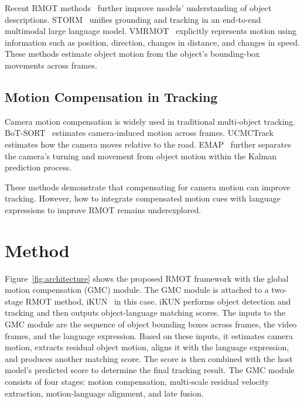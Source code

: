 \documentclass{article}
\begin{document}
Recent RMOT methods~\cite{deeprmot} further improve models' understanding of object descriptions. STORM~\cite{storm} unifies grounding and tracking in an end-to-end multimodal large language model. VMRMOT~\cite{vmrmot} explicitly represents motion using information such as position, direction, changes in distance, and changes in speed. These methods estimate object motion from the object's bounding-box movements across frames.

\subsection{Motion Compensation in Tracking}
Camera motion compensation is widely used in traditional multi-object tracking. BoT-SORT~\cite{botsort} estimates camera-induced motion across frames. UCMCTrack~\cite{ucmctrack} estimates how the camera moves relative to the road. EMAP~\cite{emap} further separates the camera's turning and movement from object motion within the Kalman prediction process.

These methods demonstrate that compensating for camera motion can improve tracking. However, how to integrate compensated motion cues with language expressions to improve RMOT remains underexplored.



\section{Method}
\label{sec:method}
Figure~\ref{fig:architecture} shows the proposed RMOT framework with the global motion compensation (GMC) module. The GMC module is attached to a two-stage RMOT method, iKUN~\cite{ikun} in this case. iKUN performs object detection and tracking and then outputs object-language matching scores. The inputs to the GMC module are the sequence of object bounding boxes across frames, the video frames, and the language expression. Based on these inputs, it estimates camera motion, extracts residual object motion, aligns it with the language expression, and produces another matching score. The score is then combined with the host model's predicted score to determine the final tracking result. The GMC module consists of four stages: motion compensation, multi-scale residual velocity extraction, motion-language alignment, and late fusion.
\end{document}
